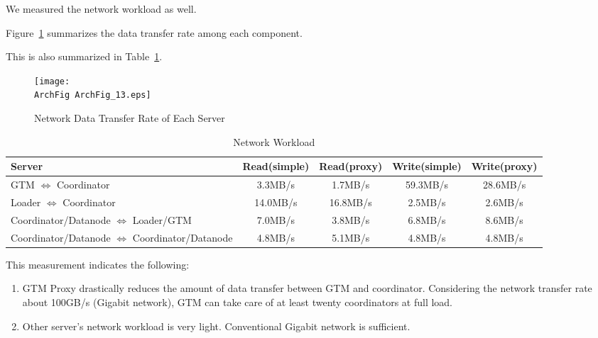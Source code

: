 

  We measured the network workload as well.
  
  Figure~\ref{Archfig:13_2} summarizes the data transfer rate among each component.
  
  This is also summarized in Table~\ref{Archtab:2}.
  
  \begin{figure}[htp]
	  \begin{center}
		  \texttt{[image: \\ArchFig ArchFig\_13.eps]}
		  \caption{\label{Archfig:13_2}Network Data Transfer Rate of Each Server}
	  \end{center}
  \end{figure}
  
  \begin{table}[htp]
	  \begin{center}
		  \caption{\label{Archtab:2} \XC{} Network Workload}
		  \begin{tabular}{|p{4.5cm}|c|c|c|c|} \hline
			  Server&Read(simple)&Read(proxy)&Write(simple)&Write(proxy)\\\hline
			  GTM $\Leftrightarrow$ Coordinator&3.3MB/s&1.7MB/s&59.3MB/s&28.6MB/s\\\hline
			  Loader $\Leftrightarrow$ Coordinator&14.0MB/s&16.8MB/s&2.5MB/s&2.6MB/s\\\hline
			  Coordinator/Datanode $\Leftrightarrow$ Loader/GTM&7.0MB/s&3.8MB/s&6.8MB/s&8.6MB/s\\\hline
			  Coordinator/Datanode $\Leftrightarrow$ Coordinator/Datanode&4.8MB/s&5.1MB/s&4.8MB/s&4.8MB/s\\\hline
		  \end{tabular}
	  \end{center}
  \end{table}
  
  This measurement indicates the following:
  
  \begin{enumerate}
	  \item GTM Proxy drastically reduces the amount of data transfer between GTM and coordinator.
	  		Considering the network transfer rate about 100GB/s (Gigabit network), GTM can
			take care of at least twenty coordinators at full load.
	  \item Other server's network workload is very light.   Conventional Gigabit network is
	  		sufficient.
  \end{enumerate}


